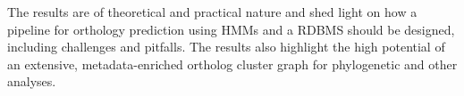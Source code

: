 The results are of theoretical and practical nature and shed light on how a
pipeline for orthology prediction using HMMs and a RDBMS should be designed,
including challenges and pitfalls. The results also highlight the high
potential of an extensive, metadata-enriched ortholog cluster graph for
phylogenetic and other analyses. 

